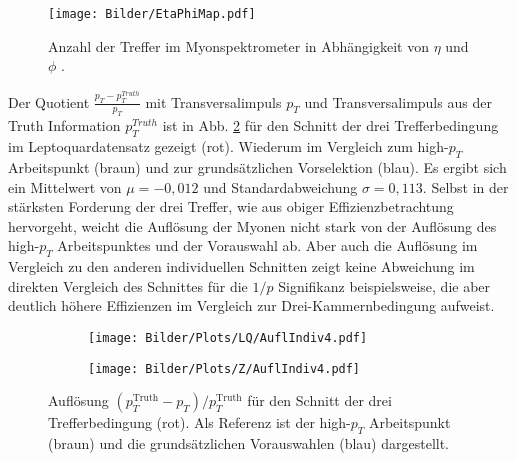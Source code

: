 \begin{figure}[htbp]                                 
  \begin{center}                                       
  \texttt{[image: Bilder/EtaPhiMap.pdf]} 
   \caption[Anzahl der Treffer im Myonspektrometer in Abhängigkeit von $\eta$ und $\phi$]{Anzahl der Treffer im Myonspektrometer in Abhängigkeit von $\eta$ und $\phi$ \cite{KammernCount}.}
   \label{EtaPhiMap}                                     
   \end{center}
\end{figure}
%
%
%
Der Quotient $\frac{p_T-p_T^{Truth}}{p_T}$ mit Transversalimpuls $p_T$ und Transversalimpuls aus der Truth Information $p_T^{Truth}$ ist in Abb. \ref{AuflIndiv4LQ} für den Schnitt der drei Trefferbedingung im Leptoquardatensatz gezeigt (rot). Wiederum im Vergleich zum high-$p_T$ Arbeitspunkt (braun) und zur grundsätzlichen Vorselektion (blau). Es ergibt sich ein Mittelwert von $\mu=-0,012$ und Standardabweichung $\sigma=0,113$. Selbst in der stärksten Forderung der drei Treffer, wie aus obiger Effizienzbetrachtung hervorgeht, weicht die Auflösung der Myonen nicht stark von der Auflösung des high-$p_T$ Arbeitspunktes und der Vorauswahl ab. Aber auch die Auflösung im Ver\-gleich zu den anderen individuellen Schnitten zeigt keine Abweichung im direkten Vergleich des Schnittes für die $1/p$ Signifikanz beispielsweise, die aber deutlich höhere Effizienzen im Vergleich zur Drei-Kammernbedingung aufweist.
\begin{figure}
  \begin{subfigure}[t]{0.55\textwidth}
  \texttt{[image: Bilder/Plots/LQ/AuflIndiv4.pdf]}
  \label{AuflIndiv4LQ}
  \end{subfigure}
\begin{subfigure}[t]{0.55\textwidth}
 \texttt{[image: Bilder/Plots/Z/AuflIndiv4.pdf]}
  \label{AuflIndiv4Z}
\end{subfigure}
\caption{Auflösung $(p_T^{\text{Truth}}-p_T)/p_T^{\text{Truth}}$ für den Schnitt der drei Trefferbedingung (rot). Als Referenz ist der high-$p_T$ Arbeitspunkt (braun) und die grundsätzlichen Vorauswahlen (blau) dargestellt.}
\label{AuflIndiv4}
\end{figure} 
